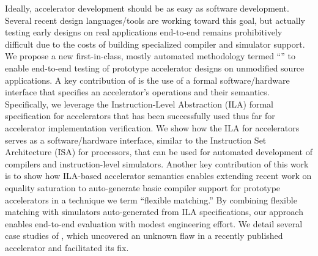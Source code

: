 Ideally,
  accelerator development
  should be as easy as
  software development.
Several recent design languages/tools
  are working
  toward this goal,
  but actually testing early designs
  on real applications end-to-end 
  remains prohibitively difficult
  due to the costs of building specialized
  compiler and simulator support.
We propose a new first-in-class, mostly automated methodology 
termed ``\TLA'' %
to enable
  end-to-end testing of prototype accelerator designs
  on unmodified source applications.
A key contribution of \TLA is the use of a formal software/hardware interface that specifies an accelerator's
  operations and their semantics. Specifically, we leverage the Instruction-Level Abstraction (ILA) formal specification for accelerators that has been successfully used thus far for accelerator implementation verification. We show how the ILA for accelerators serves as a software/hardware interface, similar to the Instruction Set Architecture (ISA) for processors, that can be used for automated development of compilers and instruction-level simulators.
  Another key contribution of this work is to show how ILA-based accelerator semantics enables
  extending recent work on equality saturation
  to auto-generate basic compiler support
  for prototype accelerators in a technique we
  term ``flexible matching.''
By combining flexible matching with
  simulators auto-generated from ILA specifications,
  our approach enables end-to-end evaluation
  with modest engineering effort.
We detail several case studies
  of \TLA, which uncovered
  an unknown flaw in
  a recently published accelerator and
  facilitated its fix.
  
